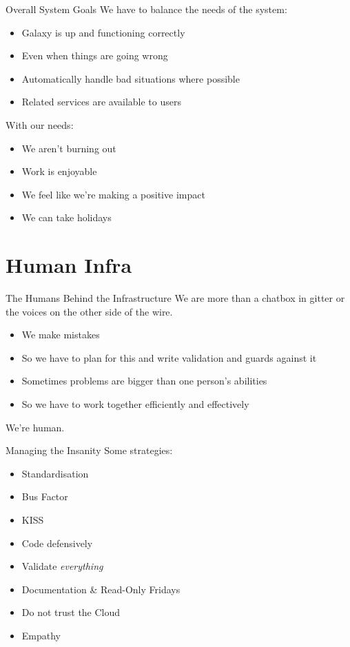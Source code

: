 \documentclass[12pt]{ufrslides}
\begin{document}
\begin{frame}{Overall System Goals}
	We have to balance the needs of the system:
	\vfill
	\begin{itemize}
		\item Galaxy is up and functioning correctly
		\item Even when things are going wrong
		\item Automatically handle bad situations where possible
		\item Related services are available to users
	\end{itemize}
	\vfill
	With our needs:
	\vfill
	\begin{itemize}
		\item We aren't burning out
		\item Work is enjoyable
		\item We feel like we're making a positive impact
		\item We can take holidays
	\end{itemize}
\end{frame}

\section{Human Infra}
\begin{frame}{The Humans Behind the Infrastructure}
	We are more than a chatbox in gitter or the voices on the other side of the
	wire.
	\vfill
	\begin{itemize}
		\item We make mistakes
		\item So we have to plan for this and write validation and guards against it
		\item Sometimes problems are bigger than one person's abilities
		\item So we have to work together efficiently and effectively
	\end{itemize}
	\vfill
	We're human.
\end{frame}

\begin{frame}{Managing the Insanity}
	Some strategies:
	\begin{itemize}
		\item Standardisation
		\item Bus Factor
		\item KISS
		\item Code defensively
		\item Validate \emph{everything}
		\item Documentation \& Read-Only Fridays
		\item Do not trust the Cloud
		\item Empathy
	\end{itemize}
\end{frame}
\end{document}
